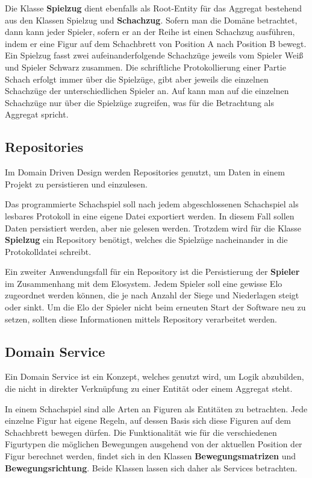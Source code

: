 Die Klasse \textbf{Spielzug} dient ebenfalls als Root-Entity für das Aggregat bestehend aus den Klassen Spielzug und \textbf{Schachzug}.
Sofern man die Domäne betrachtet, dann kann jeder Spieler, sofern er an der Reihe ist einen Schachzug ausführen, indem er eine Figur auf dem Schachbrett von Position A nach Position B bewegt. 
Ein Spielzug fasst zwei aufeinanderfolgende Schachzüge jeweils vom Spieler Weiß und Spieler Schwarz zusammen.
Die schriftliche Protokollierung einer Partie Schach erfolgt immer über die Spielzüge, gibt aber jeweils die einzelnen Schachzüge der unterschiedlichen Spieler an. 
Auf kann man auf die einzelnen Schachzüge nur über die Spielzüge zugreifen, was für die Betrachtung als Aggregat spricht. 

\subsection*{Repositories}

Im Domain Driven Design werden Repositories genutzt, um Daten in einem Projekt zu persistieren und einzulesen. 

Das programmierte Schachspiel soll nach jedem abgeschlossenen Schachspiel als lesbares Protokoll in eine eigene Datei exportiert werden. 
In diesem Fall sollen Daten persistiert werden, aber nie gelesen werden. 
Trotzdem wird für die Klasse \textbf{Spielzug} ein Repository benötigt, welches die Spielzüge nacheinander in die Protokolldatei schreibt. 

Ein zweiter Anwendungsfall für ein Repository ist die Persistierung der \textbf{Spieler} im Zusammenhang mit dem Elosystem. 
Jedem Spieler soll eine gewisse Elo zugeordnet werden können, die je nach Anzahl der Siege und Niederlagen steigt oder sinkt. 
Um die Elo der Spieler nicht beim erneuten Start der Software neu zu setzen, sollten diese Informationen mittels Repository verarbeitet werden. 

\subsection*{Domain Service}

Ein Domain Service ist ein Konzept, welches genutzt wird, um Logik abzubilden, die nicht in direkter Verknüpfung zu einer Entität oder einem Aggregat steht. 

In einem Schachspiel sind alle Arten an Figuren als Entitäten zu betrachten. 
Jede einzelne Figur hat eigene Regeln, auf dessen Basis sich diese Figuren auf dem Schachbrett bewegen dürfen. 
Die Funktionalität wie für die verschiedenen Figurtypen die möglichen Bewegungen ausgehend von der aktuellen Position der Figur berechnet werden, findet sich in den Klassen \textbf{Bewegungsmatrizen} und \textbf{Bewegungsrichtung}.
Beide Klassen lassen sich daher als Services betrachten.